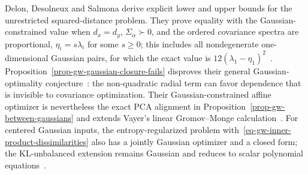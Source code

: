 Delon, Desolneux and Salmona derive explicit lower and upper bounds for the unrestricted squared-distance problem. They prove equality with the Gaussian-constrained value when $d_x=d_y$, $\Sigma_\alpha\succ0$, and the ordered covariance spectra are proportional, $\eta_i=s\lambda_i$ for some $s\geq0$; this includes all nondegenerate one-dimensional Gaussian pairs, for which the exact value is $12(\lambda_1-\eta_1)^2$~\cite[Theorem~4.1, Proposition~5.2 and Corollary~5.1]{SalmonaDelonDesolneux2022GaussianGW}. Proposition~\ref{prop-gw-gaussian-closure-fails} disproves their general Gaussian-optimality conjecture~\cite[Section~6]{SalmonaDelonDesolneux2022GaussianGW}: the non-quadratic radial term can favor dependence that is invisible to covariance optimization. Their Gaussian-constrained affine optimizer is nevertheless the exact PCA alignment in Proposition~\ref{prop-gw-between-gaussians} and extends Vayer's linear Gromov--Monge calculation~\cite[Theorem~4.2.6]{Vayer2020IncomparableSpaces}. For centered Gaussian inputs, the entropy-regularized problem with~\eqref{eq-gw-inner-product-dissimilarities} also has a jointly Gaussian optimizer and a closed form; the KL-unbalanced extension remains Gaussian and reduces to scalar polynomial equations~\cite{LeEtAl2022EntropicGaussianGW}.

